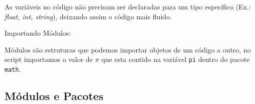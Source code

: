             As variáveis no código não precisam ser declaradas para um 
            tipo específico (Ex.: \textit{float, int, string}), deixando assim o código mais fluido. 
            \begin{quote}
            
                                                       
            \end{quote}
            
            Importando Módulos:
            
            Módulos são estruturas que podemos importar objetos de um código a outro,
            no script  importamos o valor de $\pi$ que esta contido na variável \verb|pi| dentro do pacote \verb|math|. 
            
            \begin{quote}
                                                        
            \end{quote}
            
        \subsection{Módulos e Pacotes}
            
